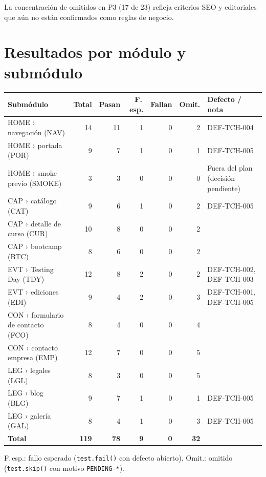 \documentclass[11pt,a4paper]{article}
\newcommand{\code}[1]{\texttt{#1}}
\begin{document}
La concentración de omitidos en P3 (17 de 23) refleja criterios SEO y editoriales que aún no están confirmados como reglas de negocio.

\section{Resultados por módulo y submódulo}

\begin{center}\small
\begin{tabularx}{\textwidth}{@{}l r r r r r Y@{}}
\toprule
Submódulo & Total & Pasan & F.\,esp. & Fallan & Omit. & Defecto / nota \\
\midrule
HOME › navegación (NAV) & 14 & 11 & 1 & 0 & 2 & DEF-TCH-004 \\
HOME › portada (POR) & 9 & 7 & 1 & 0 & 1 & DEF-TCH-005 \\
HOME › smoke previo (SMOKE) & 3 & 3 & 0 & 0 & 0 & Fuera del plan (decisión pendiente) \\
\addlinespace
CAP › catálogo (CAT) & 9 & 6 & 1 & 0 & 2 & DEF-TCH-005 \\
CAP › detalle de curso (CUR) & 10 & 8 & 0 & 0 & 2 & \\
CAP › bootcamp (BTC) & 8 & 6 & 0 & 0 & 2 & \\
\addlinespace
EVT › Testing Day (TDY) & 12 & 8 & 2 & 0 & 2 & \mbox{DEF-TCH-002,} \mbox{DEF-TCH-003} \\
EVT › ediciones (EDI) & 9 & 4 & 2 & 0 & 3 & \mbox{DEF-TCH-001,} \mbox{DEF-TCH-005} \\
\addlinespace
CON › formulario de contacto (FCO) & 8 & 4 & 0 & 0 & 4 & \\
CON › contacto empresa (EMP) & 12 & 7 & 0 & 0 & 5 & \\
\addlinespace
LEG › legales (LGL) & 8 & 3 & 0 & 0 & 5 & \\
LEG › blog (BLG) & 9 & 7 & 1 & 0 & 1 & DEF-TCH-005 \\
LEG › galería (GAL) & 8 & 4 & 1 & 0 & 3 & DEF-TCH-005 \\
\midrule
\textbf{Total} & \textbf{119} & \textbf{78} & \textbf{9} & \textbf{0} & \textbf{32} & \\
\bottomrule
\end{tabularx}
\end{center}

{\footnotesize\color{muted}F.\,esp.: fallo esperado (\code{test.fail()} con defecto abierto). Omit.: omitido (\code{test.skip()} con motivo \code{PENDING-*}).}
\end{document}
